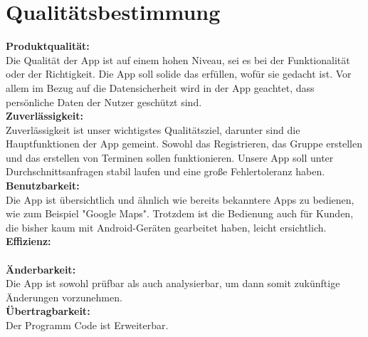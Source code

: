 \section{Qualitätsbestimmung}
\textbf{Produktqualität:}\\ %
Die Qualität der App ist auf einem hohen Niveau, sei es bei der Funktionalität oder der Richtigkeit. Die App soll solide das erfüllen, wofür sie gedacht ist. Vor allem im Bezug auf die Datensicherheit wird in der App geachtet, dass persönliche Daten der Nutzer geschützt sind.\\
\textbf{Zuverlässigkeit:}\\%
Zuverlässigkeit ist unser wichtigstes Qualitätsziel, darunter sind die Hauptfunktionen der App gemeint. Sowohl das Registrieren, das Gruppe erstellen und das erstellen von Terminen sollen funktionieren. Unsere App soll unter Durchschnittsanfragen stabil laufen und eine große Fehlertoleranz haben. \\
\textbf{Benutzbarkeit:}\\ %
Die App ist übersichtlich und ähnlich wie bereits bekanntere Apps zu bedienen, wie zum Beispiel "Google Maps". Trotzdem ist die Bedienung auch für Kunden, die bisher kaum mit Android-Geräten gearbeitet haben, leicht ersichtlich.\\
\textbf{Effizienz:}\\ %
\\
\textbf{Änderbarkeit:}\\ %
Die App ist sowohl prüfbar als auch analysierbar, um dann somit zukünftige Änderungen vorzunehmen. \\
\textbf{Übertragbarkeit:}\\%
Der Programm Code ist Erweiterbar.\\


